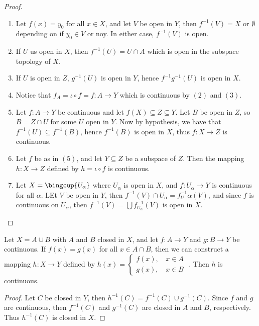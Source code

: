 \begin{proof}
    \begin{enumerate}[label=(\arabic*)]
        \item Let $f (x)=y_0$ for all $x \in X$, and let  $V$ be open in  $Y$, then  $f^{-1}(V)=X$
            or $\emptyset$ depending on if $ y_0 \in V$ or noy. In either case, $f^{-1}(V)$ is open.

        \item If $U$ us open in  $X$, then  $f^{-1}(U)=U \cap A$ which is open in the subspace
            topology of $X$.

        \item If $U$ is open in  $Z$,  $g^{-1}(U)$ is open in $Y$, hence  $f^{-1}g^{-1}(U)$ is
            open in $X$.

        \item Notice that  $f_A=\iota \circ f=f:A \rightarrow Y$ which is continuous by $(2)$
            and $(3)$.

        \item Let $f:A \rightarrow Y$ be continuous and let  $f(X) \subseteq Z \subseteq Y$. Let $B$
            be open in  $Z$, so  $B=Z \cap U$ for some  $U$ open in  $Y$. Now by hypothesis, we have
            that $f^{-1}(U) \subseteq f^{-1}(B)$, hence $f^{-1}(B)$ is open in $X$, thus  $f:X
            \rightarrow Z$ is continuous.

        \item Let  $f$ be as in  $(5)$, and let $Y \subseteq Z$ be a subspace of  $Z$. Then the
            mapping  $h:X \rightarrow Z$ defined by $h=\iota \circ f$ is continuous.

        \item Let  $X=\bingcup{U_{\alpha}}$ where $U_{\alpha}$ is open in $X$, and $f:U_{\alpha}
            \rightarrow Y$ is continuous for all  $\alpha$. LEt $V$ be open in  $Y$, then
            $f^{-1}(V) \cap U_{\alpha}=f^{-1}_U{\alpha}(V)$, and since $f$ is continuous on
            $U_{\alpha}$, then $f^{-1}(V)=\bigcup{f^{-1}_{U_{\alpha}}(V)}$ is open in $X$.
    \end{enumerate}
\end{proof}

\begin{theorem}\label{1.7.4}
    Let $X=A \cup B$ with  $A$ and  $B$ closed in  $X$, and let  $f:A \rightarrow Y$ and  $g:B
    \rightarrow Y$ be continuous. If  $f(x)=g(x)$ for all $x \in A \cap B$, then we can
    construct a mapping  $h:X \rightarrow Y$ defined by  $h(x)=
        \begin{cases}
            f(x) \text{, } & x \in A \\
            g(x) \text{, } & x \in B
        \end{cases}$
    . Then $h$ is continuous.
\end{theorem}
\begin{proof} 
    Let $C$ be closed in  $Y$, then  $h^{-1}(C)=f^{-1}(C) \cup g^{-1}(C)$. Since $f$ and  $g$ are
    continuous, then  $f^{-1}(C)$ and $g^{-1}(C)$ are closed in $A$ and  $B$, respectively. Thus
    $h^{-1}(C)$ is closed in $X$.
\end{proof}


